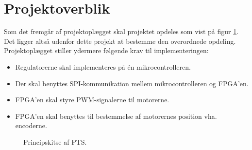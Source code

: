 \section{Projektoverblik}
\label{sec:projektoverblik}
Som det fremgår af projektoplægget skal projektet opdeles som vist på 
figur \ref{fig:overview_openloop_PTS}. 
Det ligger altså udenfor dette projekt at bestemme den overordnede opdeling.
Projektoplægget stiller ydermere følgende krav til implementeringen:
\begin{itemize}
\itemsep1pt
  \item Regulatorerne skal implementeres på én mikrocontrolleren.
  \item Der skal benyttes SPI-kommunikation mellem mikrocontrolleren og FPGA’en.
  \item FPGA’en skal styre PWM-signalerne til motorerne.
  \item FPGA’en skal benyttes til bestemmelse af motorernes position vha. encoderne.
\end{itemize}
\begin{figure}[!th]
\centering
\begin{tikzpicture}[auto, node distance=1cm,>=latex']

\end{tikzpicture}
\caption[Principskitse af PTS]{Principskitse af PTS.}
\label{fig:overview_openloop_PTS}
\end{figure}



